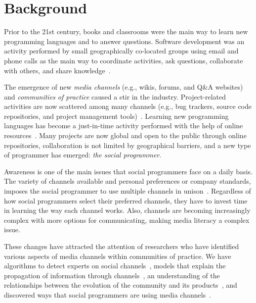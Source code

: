 \documentclass{sig-alternate-05-2015}
\begin{document}
\section{Background}
\label{cha:background}
	Prior to the 21st century, books and classrooms were the main way to learn new programming languages and to answer questions.
	Software development was an activity performed by small geographically co-located groups using email and phone calls as the main way to coordinate activities, ask questions, collaborate with others, and share knowledge~\cite{Storey2014}.

	The emergence of new \textit{media channels} (e.g., wikis, forums, and Q\&A websites) and \textit{communities of practice} caused a stir in the industry.
	Project-related activities are now scattered among many channels (e.g., bug trackers, source code repositories, and project management tools)~\cite{Guzzi2013}.
	Learning new programming languages has become a just-in-time activity performed with the help of online resources~\cite{Sim2013,Storey2010,Hartmann2008}.
	Many projects are now global and open to the public through online repositories, collaboration is not limited by geographical barriers, and a new type of programmer has emerged: \textit{the social programmer}.

	Awareness is one of the main issues that social programmers face on a daily basis.
	The variety of channels available and personal preferences or company standards, imposes the social programmer to use multiple channels in unison~\cite{Storey2010, Storey2014}.
	Regardless of how social programmers select their preferred channels, they have to invest time in learning the way each channel works.
	Also, channels are becoming increasingly complex with more options for communicating, making media literacy a complex issue.

	These changes have attracted the attention of researchers who have identified various aspects of media channels within communities of practice.
	We have algorithms to detect experts on social channels~\cite{Pal2011a,Pal2012a}, models that explain the propagation of information through channels~\cite{Jin2013, Jiang2013}, an understanding of the relationships between the evolution of the community and its products~\cite{German2013}, and discovered ways that social programmers are using media channels~\cite{Sowe2008a, Singh2009, Parnin2013}.
\end{document}
